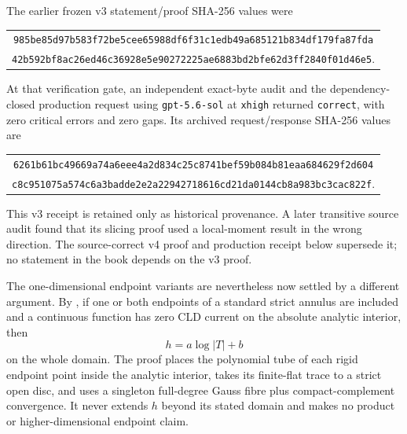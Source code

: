 The earlier frozen v3 statement/proof SHA-256 values were
\begin{center}
\small
\begin{tabular}{@{}c@{}}
\nolinkurl{985be85d97b583f72be5cee65988df6f31c1edb49a685121b834df179fa87fda}\\
\nolinkurl{42b592bf8ac26ed46c36928e5e90272225ae6883bd2bfe62d3ff2840f01d46e5}.
\end{tabular}
\end{center}
At that verification gate, an independent exact-byte audit and the
dependency-closed production request using \texttt{gpt-5.6-sol} at
\texttt{xhigh} returned \texttt{correct}, with zero critical errors and zero
gaps.  Its archived request/response SHA-256 values are
\begin{center}
\small
\begin{tabular}{@{}c@{}}
\nolinkurl{6261b61bc49669a74a6eee4a2d834c25c8741bef59b084b81eaa684629f2d604}\\
\nolinkurl{c8c951075a574c6a3badde2e2a22942718616cd21da0144cb8a983bc3cac822f}.
\end{tabular}
\end{center}
This v3 receipt is retained only as historical provenance.  A later
transitive source audit found that its slicing proof used a local-moment
result in the wrong direction.  The source-correct v4 proof and production
receipt below supersede it; no statement in the book depends on the v3
proof.

The one-dimensional endpoint variants are nevertheless now settled by a
different argument.  By
, if one or both endpoints
of a standard strict annulus are included and a continuous function has
zero CLD current on the absolute analytic interior, then
\[
                              h=a\log|T|+b
\]
on the whole domain.  The proof places the polynomial tube of each rigid
endpoint point inside the analytic interior, takes its finite-flat trace to
a strict open disc, and uses a singleton full-degree Gauss fibre plus
compact-complement convergence.  It never extends \(h\) beyond its stated
domain and makes no product or higher-dimensional endpoint claim.

